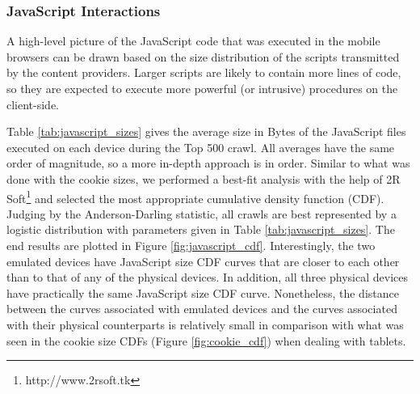 \documentclass{acm_proc_article-sp}
\begin{document}
\subsubsection{JavaScript Interactions}

A high-level picture of the JavaScript code that was executed in the mobile browsers can be drawn based on the size distribution of the scripts transmitted by the content providers. Larger scripts are likely to contain more lines of code, so they are expected to execute more powerful (or intrusive) procedures on the client-side.

Table \ref{tab:javascript_sizes} gives the average size in Bytes of the JavaScript files executed on each device during the Top 500 crawl. All averages have the same order of magnitude, so a more in-depth approach is in order.  Similar to what was done with the cookie sizes, we performed a best-fit analysis with the help of 2R Soft\footnote{http://www.2rsoft.tk} and selected the most appropriate cumulative density function (CDF). Judging by the Anderson-Darling statistic, all crawls are best represented by a logistic distribution with parameters given in Table \ref{tab:javascript_sizes}. The end results are plotted in Figure \ref{fig:javascript_cdf}. Interestingly, the two emulated devices have JavaScript size CDF curves that are closer to each other than to that of any of the physical devices. In addition, all three physical devices have practically the same JavaScript size CDF curve. Nonetheless, the distance between the curves associated with emulated devices and the curves associated with their physical counterparts is relatively small in comparison with what was seen in the cookie size CDFs (Figure \ref{fig:cookie_cdf}) when dealing with tablets.
\end{document}
